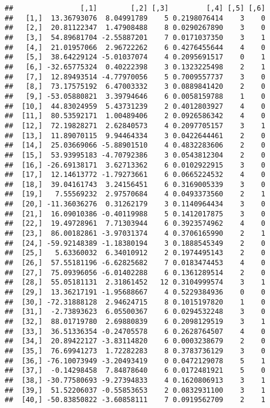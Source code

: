 \documentclass[]{article}
\begin{document}
\begin{verbatim}
##                [,1]        [,2] [,3]         [,4] [,5] [,6]
##   [1,]  13.36793076  8.04991789    5 0.2198076414    3    0
##   [2,]  20.81122347  1.47908488    8 0.0290267890    3    0
##   [3,]  54.89681704 -2.55887201    7 0.0171037350    3    1
##   [4,]  21.01957066  2.96722262    6 0.4276455644    4    0
##   [5,]  38.64229124 -5.01037074    4 0.2095691517    0    1
##   [6,] -32.65775324  0.40222398    3 0.1323225498    2    1
##   [7,]  12.89493514 -4.77970056    5 0.7009557737    3    0
##   [8,]  73.17575192  6.47003332    3 0.0889841420    2    0
##   [9,] -53.05880821  3.39794646    6 0.0058159788    1    0
##  [10,]  44.83024959  5.43731239    2 0.4012803927    4    0
##  [11,]  80.53592171  1.00489406    2 0.0926586342    4    0
##  [12,]  72.19828271  2.62840573    4 0.2097705157    3    1
##  [13,]  11.89070115  9.94464334    3 0.0422644461    2    0
##  [14,]  25.03669066 -5.88901510    4 0.4832283606    2    0
##  [15,]  53.93995183 -4.70792386    3 0.0543812304    2    0
##  [16,] -26.69138171  3.62713362    6 0.0102922915    3    0
##  [17,]  12.14613772 -1.79273661    6 0.0665224532    4    0
##  [18,]  39.04161743  3.24156451    6 0.3169005339    3    0
##  [19,]   7.55569232  2.97570684    4 0.0493373560    2    1
##  [20,] -11.36036276  0.31262179    3 0.1140964434    3    0
##  [21,]  16.09010386 -0.40119988    5 0.1412017875    3    0
##  [22,]  19.49728961  7.71303944    6 0.3923574962    4    0
##  [23,]  86.00182861 -3.97031374    4 0.3706165990    2    1
##  [24,] -59.92148389 -1.18380194    3 0.1888545349    2    0
##  [25,]   5.63360032  6.34010912    2 0.1974495143    2    0
##  [26,]  57.55181196 -6.62825682    7 0.0183474453    4    0
##  [27,]  75.09396056 -6.01402288    6 0.1361289514    2    0
##  [28,]  55.05181131  2.31861452   12 0.3104999574    3    1
##  [29,]  13.36217191 -1.95688667    4 0.5229384936    0    0
##  [30,] -72.31888128  2.94624715    8 0.1015197820    1    0
##  [31,]  -2.73893623  6.05500367    6 0.0294532248    3    0
##  [32,]  88.01719780  2.69880839    6 0.2098129519    3    1
##  [33,]  36.51336354 -0.24705578    6 0.2628764507    4    0
##  [34,]  20.89422127 -3.83114820    6 0.0003238679    2    0
##  [35,]  76.69941273  1.72282283    8 0.3783736129    3    0
##  [36,] -76.10073949 -3.20493419    0 0.0472129078    5    1
##  [37,]  -0.14298458  7.84878640    6 0.0172481921    5    0
##  [38,] -30.77580693 -9.27394833    4 0.1620806913    3    1
##  [39,]  51.52206037 -0.55853653    2 0.0832931100    3    1
##  [40,] -50.83850822 -3.60858111    7 0.0919562709    2    1

\end{verbatim}
\end{document}

